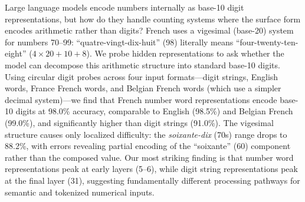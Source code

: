 Large language models encode numbers internally as base-10 digit representations, but how do they handle counting systems where the surface form encodes arithmetic rather than digits? French uses a vigesimal (base-20) system for numbers 70--99: ``quatre-vingt-dix-huit'' (98) literally means ``four-twenty-ten-eight'' ($4\times20+10+8$). We probe \mistral hidden representations to ask whether the model can decompose this arithmetic structure into standard base-10 digits. Using circular digit probes across four input formats---digit strings, English words, France French words, and Belgian French words (which use a simpler decimal system)---we find that French number word representations encode base-10 digits at 98.0\% accuracy, comparable to English (98.5\%) and Belgian French (99.0\%), and significantly higher than digit strings (91.0\%). The vigesimal structure causes only localized difficulty: the \emph{soixante-dix} (70s) range drops to 88.2\%, with errors revealing partial encoding of the ``soixante'' (60) component rather than the composed value. Our most striking finding is that number word representations peak at early layers (5--6), while digit string representations peak at the final layer (31), suggesting fundamentally different processing pathways for semantic and tokenized numerical inputs.
